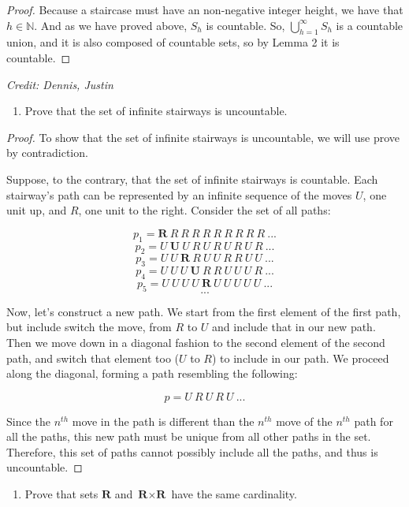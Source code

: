 \documentclass{article}
\begin{document}
\begin{proof}
    Because a staircase must have an non-negative integer height, we have that $h \in \mathbb{N}$. And as we have proved above, $S_h$ is countable. So, $\bigcup_{h = 1}^{\infty}S_h$ is a countable union, and it is also composed of countable sets, so by Lemma 2 it is countable.
\end{proof}

\textit{Credit: Dennis, Justin}

\begin{enumerate}[resume]
    \item Prove that the set of infinite stairways is uncountable.
\end{enumerate}

\begin{proof}
    To show that the set of infinite stairways is uncountable, we will use prove by contradiction.

    Suppose, to the contrary, that the set of infinite stairways is countable. Each stairway's path can be represented by an infinite sequence of the moves $U$, one unit up, and $R$, one unit to the right. Consider the set of all paths:

    \[p_1 = \textbf{R}\:R\:R\:R\:R\:R\:R\:R\:R\:R\: ...\]
    \[p_2 = U\:\textbf{U}\:U\:R\:U\:R\:U\:R\:U\:R\: ...\]
    \[p_3 = U\:U\:\textbf{R}\:R\:U\:U\:R\:R\:U\:U\: ...\]
    \[p_4 = U\:U\:U\:\textbf{U}\:R\:R\:U\:U\:U\:R\: ...\]
    \[p_5 = U\:U\:U\:U\:\textbf{R}\:U\:U\:U\:U\:U\: ...\]
    \[...\]

    Now, let's construct a new path. We start from the first element of the first path, but include switch the move, from $R$ to $U$ and include that in our new path. Then we move down in a diagonal fashion to the second element of the second path, and switch that element too ($U$ to $R$) to include in our path. We proceed along the diagonal, forming a path resembling the following:

    \[p = U\:R\:U\:R\:U\: ...\]

    Since the ${n^{th}}$ move in the path is different than the ${n^{th}}$ move of the ${n^{th}}$ path for all the paths, this new path must be unique from all other paths in the set. Therefore, this set of paths cannot possibly include all the paths, and thus is uncountable.
\end{proof}

\begin{enumerate}[resume]
    \item Prove that sets $\textbf{R}$ and $\textbf{R} \times \textbf{R}$ have the same cardinality.
\end{enumerate}
\end{document}
